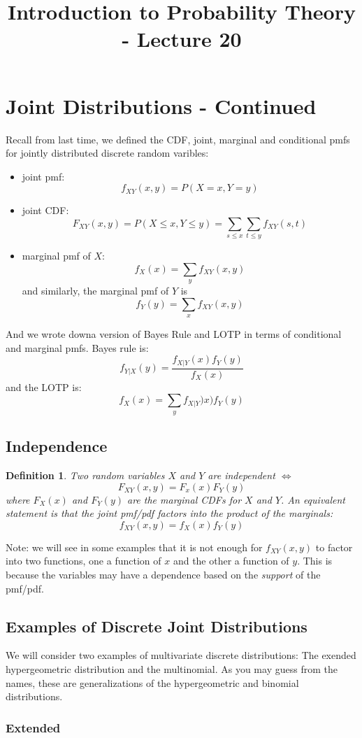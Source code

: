 \documentclass[12pt]{article} %
\date{}
\title{Introduction to Probability Theory - Lecture 20}
\newtheorem{defn}{Definition}
\begin{document}
\maketitle

\section{Joint Distributions - Continued}
Recall from last time, we defined the CDF, joint, marginal and conditional pmfs for jointly distributed discrete random varibles:
\begin{itemize}
\item joint pmf: $$f_{XY}(x,y) = P(X=x,Y=y)$$
\item joint CDF: $$F_{XY}(x,y) = P(X\leq x,Y\leq y) = \sum_{s\leq x}\sum_{t\leq y} f_{XY}(s,t)$$
\item marginal pmf of $X$:
$$f_X(x) = \sum_y f_{XY}(x,y)$$
and similarly, the marginal pmf of $Y$ is
$$f_{Y}(y) = \sum_x f_{XY}(x,y)$$  
\end{itemize}
And we wrote downa version of Bayes Rule and LOTP in terms of conditional and marginal pmfs. Bayes rule is:
$$f_{Y|X}(y) = \frac{f_{X|Y}(x) f_Y(y)}{f_X(x)}$$
and the LOTP is:
$$f_X(x) = \sum_y f_{X|Y})x) f_Y(y)$$
\subsection{Independence}
\begin{defn}
Two random variables $X$ and $Y$ are independent $\iff$ 
$$F_{XY}(x,y) = F_x(x)F_Y(y)$$
where $F_X(x)$ and $F_Y(y)$ are the marginal CDFs for $X$ and $Y$. An equivalent statement is that the joint pmf/pdf factors into the product of the marginals:
$$f_{XY}(x,y) = f_X(x)f_Y(y)$$
\end{defn} 
Note: we will see in some examples that it is not enough for $f_{XY}(x,y)$ to factor into two functions, one a function of $x$ and the other a function of $y$. This is because the variables may have a dependence based on the \emph{support} of the pmf/pdf.
\subsection{Examples of Discrete Joint Distributions}
We will consider two examples of multivariate discrete distributions: The exended hypergeometric distribution and the multinomial. As you may guess from the names, these are generalizations of the hypergeometric and binomial distributions.
\subsubsection{Extended }
\end{document}
